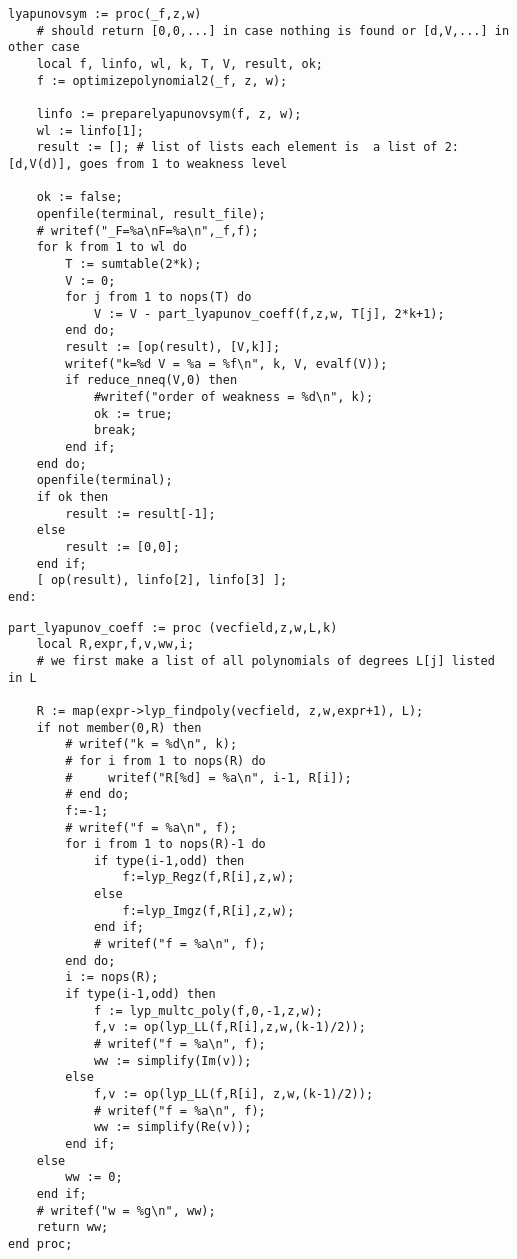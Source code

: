 \documentclass[a4paper,10pt]{article}
\begin{document}
\begin{lstlisting}[name=weakfocus]
lyapunovsym := proc(_f,z,w)
    # should return [0,0,...] in case nothing is found or [d,V,...] in other case
    local f, linfo, wl, k, T, V, result, ok;
    f := optimizepolynomial2(_f, z, w);

    linfo := preparelyapunovsym(f, z, w);
    wl := linfo[1];
    result := []; # list of lists each element is  a list of 2: [d,V(d)], goes from 1 to weakness level

    ok := false;
    openfile(terminal, result_file);
    # writef("_F=%a\nF=%a\n",_f,f);
    for k from 1 to wl do
        T := sumtable(2*k);
        V := 0;
        for j from 1 to nops(T) do
            V := V - part_lyapunov_coeff(f,z,w, T[j], 2*k+1);
        end do;
        result := [op(result), [V,k]];
        writef("k=%d V = %a = %f\n", k, V, evalf(V));
        if reduce_nneq(V,0) then
            #writef("order of weakness = %d\n", k);
            ok := true;
            break;
        end if;
    end do;
    openfile(terminal);
    if ok then
        result := result[-1];
    else
        result := [0,0];
    end if;
    [ op(result), linfo[2], linfo[3] ];
end:
\end{lstlisting}

\begin{lstlisting}[name=weakfocus]
part_lyapunov_coeff := proc (vecfield,z,w,L,k)
    local R,expr,f,v,ww,i;
    # we first make a list of all polynomials of degrees L[j] listed in L

    R := map(expr->lyp_findpoly(vecfield, z,w,expr+1), L);
    if not member(0,R) then
        # writef("k = %d\n", k);
        # for i from 1 to nops(R) do
        #     writef("R[%d] = %a\n", i-1, R[i]);
        # end do;
        f:=-1;
        # writef("f = %a\n", f);
        for i from 1 to nops(R)-1 do
            if type(i-1,odd) then
                f:=lyp_Regz(f,R[i],z,w);
            else
                f:=lyp_Imgz(f,R[i],z,w);
            end if;
            # writef("f = %a\n", f);
        end do;
        i := nops(R);
        if type(i-1,odd) then
            f := lyp_multc_poly(f,0,-1,z,w);
            f,v := op(lyp_LL(f,R[i],z,w,(k-1)/2));
            # writef("f = %a\n", f);
            ww := simplify(Im(v));
        else
            f,v := op(lyp_LL(f,R[i], z,w,(k-1)/2));
            # writef("f = %a\n", f);
            ww := simplify(Re(v));
        end if;
    else
        ww := 0;
    end if;
    # writef("w = %g\n", ww);
    return ww;
end proc;
\end{lstlisting}
\end{document}
